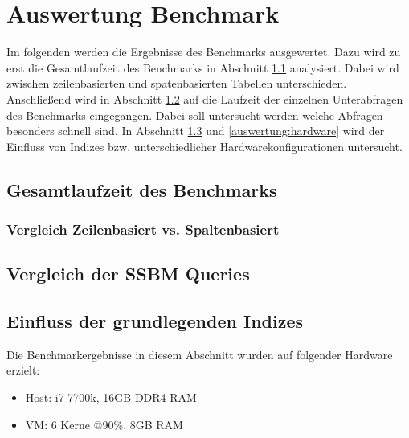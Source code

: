\chapter{Auswertung Benchmark}
Im folgenden werden die Ergebnisse des Benchmarks ausgewertet.
Dazu wird zu erst die Gesamtlaufzeit des Benchmarks in Abschnitt \ref{auswertung:generell} analysiert. Dabei wird zwischen zeilenbasierten und spatenbasierten
Tabellen unterschieden.
Anschließend wird in Abschnitt \ref{auswertung:queries} auf die Laufzeit der
einzelnen Unterabfragen des Benchmarks eingegangen.
Dabei soll untersucht werden welche Abfragen besonders schnell sind.
In Abschnitt \ref{auswertung:basic_indizes} und \ref{auswertung:hardware}
wird der Einfluss von Indizes bzw. unterschiedlicher Hardwarekonfigurationen
untersucht.

\section{Gesamtlaufzeit des Benchmarks}\label{auswertung:generell}


\subsection{Vergleich Zeilenbasiert vs. Spaltenbasiert}\label{auswertung:row_vs_col}

\section{Vergleich der SSBM Queries}\label{auswertung:queries}


\newpage
\section{Einfluss der grundlegenden Indizes}\label{auswertung:basic_indizes}
Die Benchmarkergebnisse in diesem Abschnitt wurden auf folgender Hardware erzielt:
\begin{itemize}
    \item Host: i7 7700k, 16GB DDR4 RAM
    \item VM: 6 Kerne @90\%, 8GB RAM
\end{itemize}

